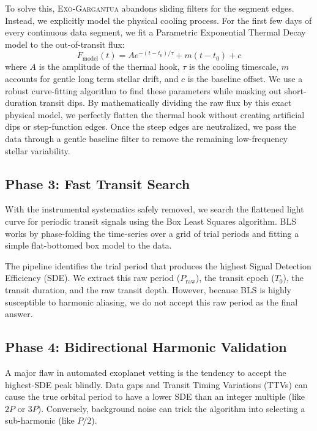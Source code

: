 \documentclass[twocolumn,linenumbers]{aastex701}
\begin{document}
To solve this, \textsc{Exo-Gargantua} abandons sliding filters for the segment edges. Instead, we explicitly model the physical cooling process. For the first few days of every continuous data segment, we fit a Parametric Exponential Thermal Decay model to the out-of-transit flux:
\begin{equation}
    F_{\text{model}}(t) = A e^{-(t - t_{0})/\tau} + m(t - t_{0}) + c
\end{equation}
where $A$ is the amplitude of the thermal hook, $\tau$ is the cooling timescale, $m$ accounts for gentle long term stellar drift, and $c$ is the baseline offset. We use a robust curve-fitting algorithm to find these parameters while masking out short-duration transit dips. By mathematically dividing the raw flux by this exact physical model, we perfectly flatten the thermal hook without creating artificial dips or step-function edges. Once the steep edges are neutralized, we pass the data through a gentle baseline filter to remove the remaining low-frequency stellar variability.

\subsection{Phase 3: Fast Transit Search}
With the instrumental systematics safely removed, we search the flattened light curve for periodic transit signals using the Box Least Squares \citep[BLS;][]{kovacs2002} algorithm. BLS works by phase-folding the time-series over a grid of trial periods and fitting a simple flat-bottomed box model to the data. 

The pipeline identifies the trial period that produces the highest Signal Detection Efficiency (SDE). We extract this raw period ($P_{\text{raw}}$), the transit epoch ($T_0$), the transit duration, and the raw transit depth. However, because BLS is highly susceptible to harmonic aliasing, we do not accept this raw period as the final answer.

\subsection{Phase 4: Bidirectional Harmonic Validation}
A major flaw in automated exoplanet vetting is the tendency to accept the highest-SDE peak blindly. Data gaps and Transit Timing Variations (TTVs) can cause the true orbital period to have a lower SDE than an integer multiple (like $2P$ or $3P$). Conversely, background noise can trick the algorithm into selecting a sub-harmonic (like $P/2$).
\end{document}
